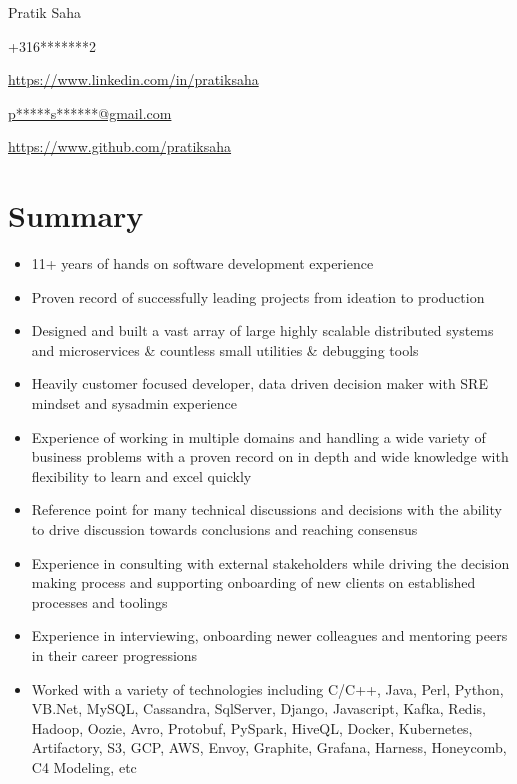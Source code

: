 \documentclass{article}
\begin{document}
\begin{center}\selectfont\Large Pratik Saha\end{center}

{\raggedright \Mobilefone \space +316*******2} \hfill { \raggedleft \faLinkedin \space \href{https://www.linkedin.com/in/pratiksaha}{https://www.linkedin.com/in/pratiksaha}   }

{\raggedright {} \space \href{mailto:p*****s******@gmail.com}{p*****s******@gmail.com}} \hfill { \raggedleft \faGithub \space  \href{https://www.github.com/pratiksaha}{https://www.github.com/pratiksaha} }

\section{Summary}
\begin{itemize}[noitemsep,nolistsep]
\item 11+ years of hands on software development experience
\item Proven record of successfully leading projects from ideation to production
\item Designed and built a vast array of large highly scalable distributed systems and microservices \& countless small utilities \& debugging tools
\item Heavily customer focused developer, data driven decision maker with SRE mindset and sysadmin experience
\item Experience of working in multiple domains and handling a wide variety of business problems with a proven record on in depth and wide knowledge with flexibility to learn and excel quickly
\item Reference point for many technical discussions and decisions with the ability to drive discussion towards conclusions and reaching consensus
\item Experience in consulting with external stakeholders while driving the decision making process and supporting onboarding of new clients on established processes and toolings
\item Experience in interviewing, onboarding newer colleagues and mentoring peers in their career progressions
\item Worked with a variety of technologies including C/C++, Java, Perl, Python, VB.Net, MySQL, Cassandra, SqlServer, Django, Javascript, Kafka, Redis, Hadoop, Oozie, Avro, Protobuf, PySpark, HiveQL, Docker, Kubernetes, Artifactory, S3, GCP, AWS, Envoy, Graphite, Grafana, Harness, Honeycomb, C4 Modeling, etc
\end{itemize}
\end{document}
